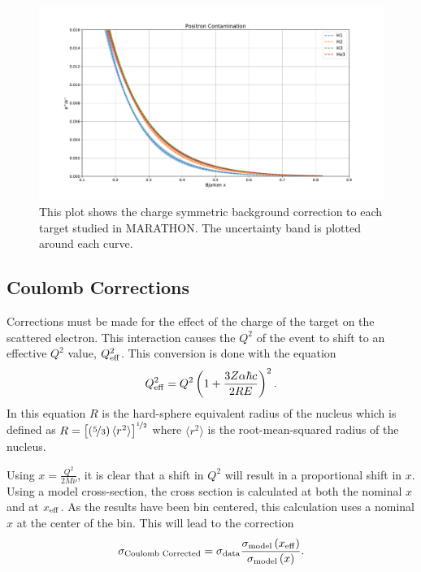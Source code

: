 \begin{figure}
	\includegraphics[width=\textwidth]{./analysis/fig/positrons.pdf}
	\caption{This plot shows the charge symmetric background correction to each target studied in MARATHON. The uncertainty band is plotted around each curve.}
	\label{fig:positrons}
\end{figure}

\subsection{Coulomb Corrections}

Corrections must be made for the effect of the charge of the target on the scattered electron. This interaction causes the $Q^2$ of the event to shift to an effective $Q^2$ value, $Q^2_{\rm eff}$. This conversion is done with the equation
\begin{equation}
	Q^2_{\rm eff} = Q^2 \left(1 + \frac{3Z\alpha\hbar c}{2RE}\right)^{2}.
\end{equation}
In this equation $R$ is the hard-sphere equivalent radius of the nucleus which is defined as $R=\left[\left(\nicefrac{5}{3}\right) \langle r^{2}\rangle\right]^{\nicefrac{1}{2}}$ where $\langle r^2\rangle$ is the root-mean-squared radius of the nucleus.\cite{coulomb}

Using $x=\frac{Q^2}{2M\nu}$, it is clear that a shift in $Q^2$ will result in a proportional shift in $x$. Using a model cross-section, the cross section is calculated at both the nominal $x$ and at $x_{\rm eff}$. As the results have been bin centered, this calculation uses a nominal $x$ at the center of the bin. This will lead to the correction
\begin{equation}
	\sigma_{\textrm{Coulomb Corrected}} = \sigma_{\rm data} \frac{\sigma_{\rm model}\left(x_{\rm eff}\right)}{\sigma_{\rm model}\left(x\right)}.
\end{equation}

